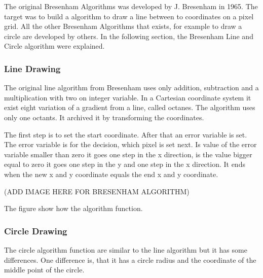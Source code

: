 The original Bresenham Algorithms was developed by J. Bresenham in 1965. The target was to build a algorithm to draw a line between to coordinates on a pixel grid. All the other Bresenham Algorithms that exists, for example to draw a circle are developed by others. In the following section, the Bresenham Line and Circle algorithm were explained.
\subsubsection*{Line Drawing}
The original line algorithm from Bresenham uses only addition, subtraction and a multiplication with two on integer variable. In a Cartesian coordinate system it exist eight variation of a gradient from a line, called octanes. The algorithm uses only one octants. It archived it by transforming the coordinates.

The first step is to set the start coordinate. After that an error variable is set. The error variable is for the decision, which pixel is set next. Is value of the error variable smaller than zero it goes one step in the x direction, is the value bigger equal to zero it goes one step in the y and one step in the x direction. It ends when the new x and y coordinate equals the end x and y coordinate.

(ADD IMAGE HERE FOR BRESENHAM ALGORITHM)

The figure show how the algorithm function. 
\subsubsection*{Circle Drawing}
The circle algorithm function are similar to the line algorithm but it has some differences. One difference is, that it has a circle radius and the coordinate of the middle point of the circle.